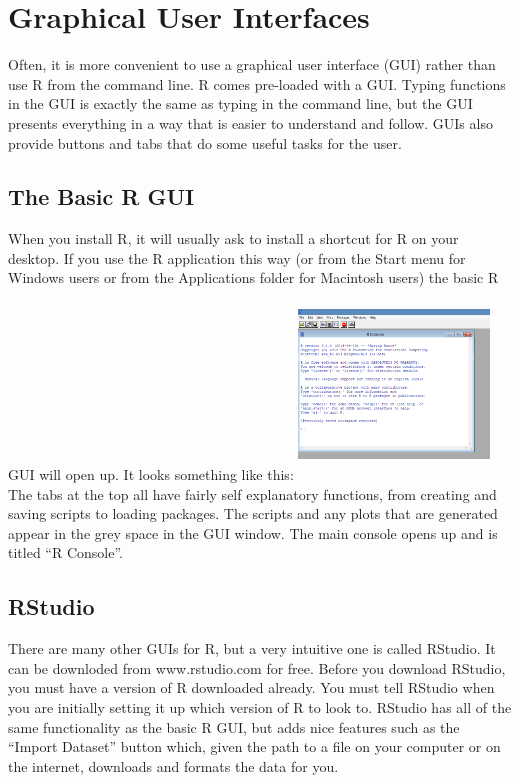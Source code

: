 \documentclass[11pt,letterpaper,fleqn]{report}
\begin{document}
\chapter{Graphical User Interfaces}
Often, it is more convenient to use a graphical user interface (GUI) rather than use R from the command line. R comes pre-loaded with a GUI. Typing functions in the GUI is exactly the same as typing in the command line, but the GUI presents everything in a way that is easier to understand and follow. GUIs also provide buttons and tabs that do some useful tasks for the user.
\section{The Basic R GUI}
When you install R, it will usually ask to install a shortcut for R on your desktop. If you use the R application this way (or from the Start menu for Windows users or from the Applications folder for Macintosh users) the basic R GUI will open up. It looks something like this:
  \newline
\includegraphics[width=2in, height=2in]{rgui_basic.png}
\newline 
The tabs at the top all have fairly self explanatory functions, from creating and saving scripts to loading packages. The scripts and any plots that are generated appear in the grey space in the GUI window. The main console opens up and is titled ``R Console''. 
\section{RStudio}
There are many other GUIs for R, but a very intuitive one is called RStudio. It can be downloded from www.rstudio.com for free. Before you download RStudio, you must have a version of R downloaded already. You must tell RStudio when you are initially setting it up which version of R to look to. RStudio has all of the same functionality as the basic R GUI, but adds nice features such as the ``Import Dataset'' button which, given the path to a file on your computer or on the internet, downloads and formats the data for you.
\end{document}
